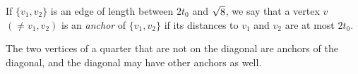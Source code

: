 


\begin{definition} \label{def:anchor}
If $\{v_1,v_2\}$ is an edge of length between $2t_0$ and $\sqrt8$,
we say that a vertex $v$ $(\ne v_1,v_2)$ is an {\it {}
anchor\/} of $\{v_1,v_2\}$ if its distances to $v_1$ and $v_2$ are
at most $2t_0$.
%
\end{definition}

The two vertices of a quarter that are not on the diagonal are
anchors of the diagonal, and the diagonal may have other anchors
as well.

